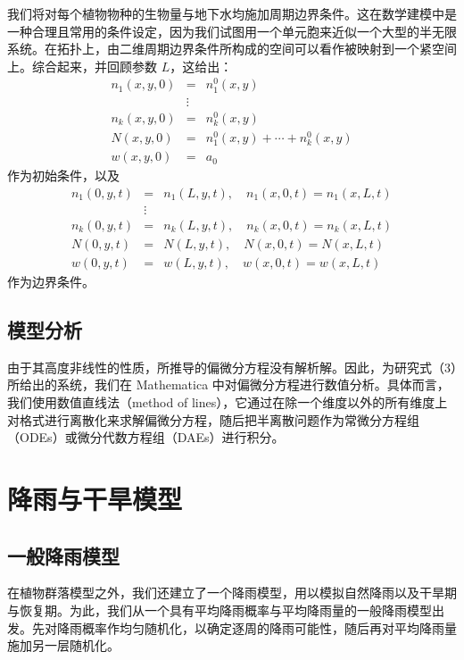 \documentclass[11pt,a4paper]{ctexart}
\begin{document}
我们将对每个植物物种的生物量与地下水均施加周期边界条件。这在数学建模中是一种合理且常用的条件设定，因为我们试图用一个单元胞来近似一个大型的半无限系统。在拓扑上，由二维周期边界条件所构成的空间可以看作被映射到一个紧空间上。综合起来，并回顾参数 $L$，这给出：
\begin{equation}
\begin{array}{rcl}
n_1(x,y,0) & = & n_1^0(x,y)\\
& \vdots & \\
n_k(x,y,0) & = & n_k^0(x,y)\\
N(x,y,0) & = & n_1^0(x,y) + \cdots + n_k^0(x,y)\\
w(x,y,0) & = & a_0
\end{array}
\end{equation}
作为初始条件，以及
\begin{equation}
\begin{array}{rcl}
n_1(0,y,t) & = & n_1(L,y,t), \quad n_1(x,0,t) = n_1(x,L,t)\\
& \vdots & \\
n_k(0,y,t) & = & n_k(L,y,t), \quad n_k(x,0,t) = n_k(x,L,t)\\
N(0,y,t) & = & N(L,y,t), \quad N(x,0,t) = N(x,L,t)\\
w(0,y,t) & = & w(L,y,t), \quad w(x,0,t) = w(x,L,t)
\end{array}
\end{equation}
作为边界条件。

\subsection{模型分析}

由于其高度非线性的性质，所推导的偏微分方程没有解析解。因此，为研究式（3）所给出的系统，我们在 Mathematica 中对偏微分方程进行数值分析。具体而言，我们使用数值直线法（method of lines），它通过在除一个维度以外的所有维度上对格式进行离散化来求解偏微分方程，随后把半离散问题作为常微分方程组（ODEs）或微分代数方程组（DAEs）进行积分。

\section{降雨与干旱模型}

\subsection{一般降雨模型}

在植物群落模型之外，我们还建立了一个降雨模型，用以模拟自然降雨以及干旱期与恢复期。为此，我们从一个具有平均降雨概率与平均降雨量的一般降雨模型出发。先对降雨概率作均匀随机化，以确定逐周的降雨可能性，随后再对平均降雨量施加另一层随机化。
\end{document}
